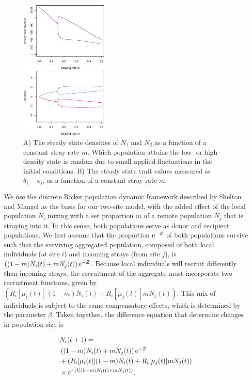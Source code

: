\documentclass[twocolumn,preprintnumbers,amsmath,amssymb,superscriptaddress]{revtex4}
\begin{document}
\begin{figure}
  \captionsetup{justification=raggedright,
singlelinecheck=false
}
\centering
\includegraphics[width=0.4\textwidth]{figs2/fig_traj.pdf}
\caption{
A) The steady state densities of $N_1$ and $N_2$ as a function of a constant stray rate $m$. Which population attains the low- or high-density state is random due to small applied fluctuations in the initial conditions.
B) The steady state trait values measured as $\theta_i - x_i$, as a function of a constant stray rate $m$. 
} \label{fig:traj}
\end{figure}

We use the discrete Ricker population dynamic framework described by Shelton and Mangel \cite{Shelton:2011eq} as the basis for our two-site model, with the added effect of the local population $N_i$ mixing with a set proportion $m$ of a remote population $N_j$ that is straying into it.
In this sense, both populations serve as donor and recipient populations.
We first assume that the proportion ${\rm e}^{-Z}$ of both populations survive such that the surviving aggregated population, composed of both local individuals (at site $i$) and incoming strays (from site $j$), is $\left((1-m)N_i(t) + m N_j(t) \right){\rm e}^{-Z}$.
Because local individuals will recruit differently than incoming strays, the recruitment of the aggregate must incorporate two recruitment functions, given by $\left(R_i[\mu_i(t)] (1-m)N_i(t) + R_i[\mu_j(t)] m N_j(t)\right)$.
This mix of individuals is subject to the same compensatory effects, which is determined by the parameter $\beta$.
Taken together, the difference equation that determine changes in population size is

\begin{align}
  &N_i(t+1) = \\ \nonumber
  &\left((1-m)N_i(t) + m N_j(t) \right){\rm e}^{-Z} \\ \nonumber
  &+ \left(R_i[\mu_i(t)] (1-m)N_i(t) + R_i[\mu_j(t)] m N_j(t)\right) \\ \nonumber
  &\times {\rm e}^{-\beta ((1-m)N_i(t) + m N_j(t))},
  \label{eq:N}
\end{align}
\end{document}

